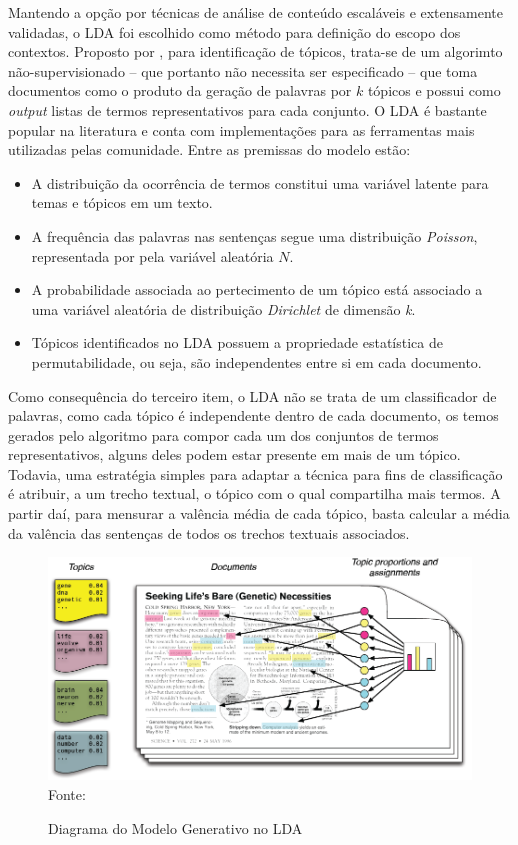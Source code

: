 \documentclass[
12pt,				%
openright,			%
twoside,			%
a4paper,			%
english,			%
french,				%
spanish,			%
brazil				%
]{abntex2}
\begin{document}
Mantendo a opção por técnicas de análise de conteúdo escaláveis e extensamente validadas, o LDA foi escolhido como método para definição do escopo dos contextos. Proposto por , para identificação de tópicos, trata-se de um algorimto não-supervisionado -- que portanto não necessita ser especificado -- que toma documentos como o produto da geração de palavras por $k$ tópicos e possui como \emph{output} listas de termos representativos para cada conjunto. O LDA é bastante popular na literatura e conta com implementações para as ferramentas mais utilizadas pelas comunidade. Entre as premissas do modelo estão:

\begin{itemize}
	\item A distribuição da ocorrência de termos constitui uma variável latente para temas e tópicos em um texto.
	\item A frequência das palavras nas sentenças segue uma distribuição \emph{Poisson}, representada por pela variável aleatória $N$.
	\item A probabilidade associada ao pertecimento de um tópico está associado a uma variável aleatória de distribuição \emph{Dirichlet} de dimensão \emph{k}.
	\item Tópicos identificados no LDA possuem a propriedade estatística de permutabilidade, ou seja, são independentes entre si em cada documento. 
\end{itemize}

Como consequência do terceiro item, o LDA não se trata de um classificador de palavras, como cada tópico é independente dentro de cada documento, os temos gerados pelo algoritmo para compor cada um dos conjuntos de termos representativos, alguns deles podem estar presente em mais de um tópico. Todavia, uma estratégia simples para adaptar a técnica para fins de classificação é atribuir, a um trecho textual, o tópico com o qual compartilha mais termos. A partir daí, para mensurar a valência média de cada tópico, basta calcular a média da valência das sentenças de todos os trechos textuais associados.

\begin{figure}[h]
	\caption{Diagrama do Modelo Generativo no LDA}
	\label{fig:lda}
	\centering
	\includegraphics[width=1\linewidth]{figures/diagrama_lda}
	Fonte: 
\end{figure}
\end{document}
